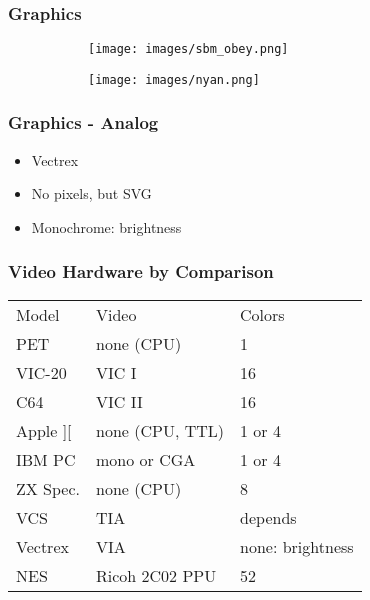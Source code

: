 \begin{frame}
\frametitle[fragile]{Graphics}

\begin{figure}
	\begin{subfigure}[b]{0.4\textwidth}
		\texttt{[image: images/sbm\_obey.png]}
	\end{subfigure}
	\begin{subfigure}[b]{0.5\textwidth}
		\texttt{[image: images/nyan.png]}
	\end{subfigure}
\end{figure}

\end{frame}


\begin{frame}
\frametitle{Graphics - Analog}

\begin{itemize}
\item Vectrex
\item No pixels, but SVG
\item Monochrome: brightness
\end{itemize}

\end{frame}


\begin{frame}
\frametitle{Video Hardware by Comparison}

\begin{tabular}{|l|l|l|}
\hline Model & Video & Colors \\
PET & none (CPU) & 1 \\
VIC-20 & VIC I & 16 \\
C64 & VIC II & 16 \\
Apple ][ & none (CPU, TTL) & 1 or 4 \\
IBM PC & mono or CGA & 1 or 4 \\
ZX Spec. & none (CPU) & 8 \\ \hline
VCS & TIA & depends \\
Vectrex & VIA & none: brightness \\
NES & Ricoh 2C02 PPU & 52 \\ \hline
\end{tabular}

\end{frame}


